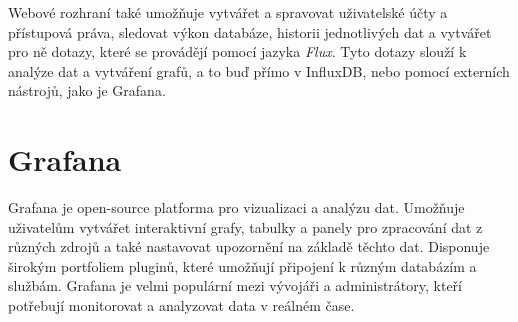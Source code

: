 Webové rozhraní také umožňuje vytvářet a spravovat uživatelské účty a přístupová práva, sledovat výkon databáze, historii jednotlivých dat a vytvářet pro ně dotazy, které se provádějí pomocí jazyka \textit{Flux}. Tyto dotazy slouží k analýze dat a vytváření grafů, a to buď přímo v InfluxDB, nebo pomocí externích nástrojů, jako je Grafana. 
\section{Grafana}
Grafana je open-source platforma pro vizualizaci a analýzu dat. Umožňuje uživatelům vytvářet interaktivní grafy, tabulky a panely pro zpracování dat z různých zdrojů a také nastavovat upozornění na základě těchto dat. Disponuje širokým portfoliem pluginů, které umožňují připojení k různým databázím a službám. Grafana je velmi populární mezi vývojáři a administrátory, kteří potřebují monitorovat a analyzovat data v reálném čase. \cite{Grafana} \newline

